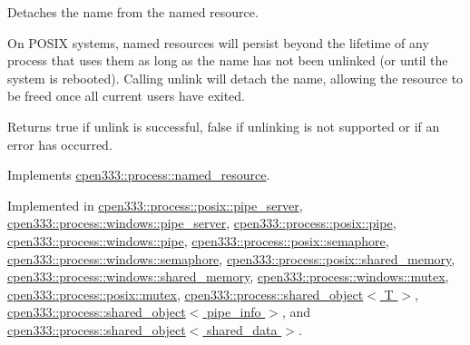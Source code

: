 Detaches the name from the named resource. 

On P\+O\+S\+IX systems, named resources will persist beyond the lifetime of any process that uses them as long as the name has not been unlinked (or until the system is rebooted). Calling {\ttfamily unlink} will detach the name, allowing the resource to be freed once all current users have exited.

\begin{DoxyReturn}{Returns}
{\ttfamily true} if unlink is successful, {\ttfamily false} if unlinking is not supported or if an error has occurred. 
\end{DoxyReturn}


Implements \hyperlink{classcpen333_1_1process_1_1named__resource_a5d33168fee48c9b0c58ab8fd96e230ce}{cpen333\+::process\+::named\+\_\+resource}.



Implemented in \hyperlink{classcpen333_1_1process_1_1posix_1_1pipe__server_a5c4da1864cb0db53e76d960230f3a83a}{cpen333\+::process\+::posix\+::pipe\+\_\+server}, \hyperlink{classcpen333_1_1process_1_1windows_1_1pipe__server_aa3f9fb4fd88042b09e130cd616815fe1}{cpen333\+::process\+::windows\+::pipe\+\_\+server}, \hyperlink{classcpen333_1_1process_1_1posix_1_1pipe_ac1dd8e1a7fd46480b709e96190afe697}{cpen333\+::process\+::posix\+::pipe}, \hyperlink{classcpen333_1_1process_1_1windows_1_1pipe_abe0bc707040aa7e82ed41c26cc4c93c1}{cpen333\+::process\+::windows\+::pipe}, \hyperlink{classcpen333_1_1process_1_1posix_1_1semaphore_aa6064e2c4b4b7282cc5e6eda877ee1bb}{cpen333\+::process\+::posix\+::semaphore}, \hyperlink{classcpen333_1_1process_1_1windows_1_1semaphore_abc5159f32e61024c6c6a978ac64fe39d}{cpen333\+::process\+::windows\+::semaphore}, \hyperlink{classcpen333_1_1process_1_1posix_1_1shared__memory_a3b6d67a41cfaca3712d87958682d8bbe}{cpen333\+::process\+::posix\+::shared\+\_\+memory}, \hyperlink{classcpen333_1_1process_1_1windows_1_1shared__memory_aa6efdc9a3e1310ea69ecc48aeb41286c}{cpen333\+::process\+::windows\+::shared\+\_\+memory}, \hyperlink{classcpen333_1_1process_1_1windows_1_1mutex_aa45381a0a226fbefc86eef8971a5431b}{cpen333\+::process\+::windows\+::mutex}, \hyperlink{classcpen333_1_1process_1_1posix_1_1mutex_ac1bcf9576d7470e5d64e17876c9cdb36}{cpen333\+::process\+::posix\+::mutex}, \hyperlink{classcpen333_1_1process_1_1shared__object_aa5b43829da5bd2376927e6285745211c}{cpen333\+::process\+::shared\+\_\+object$<$ T $>$}, \hyperlink{classcpen333_1_1process_1_1shared__object_aa5b43829da5bd2376927e6285745211c}{cpen333\+::process\+::shared\+\_\+object$<$ pipe\+\_\+info $>$}, and \hyperlink{classcpen333_1_1process_1_1shared__object_aa5b43829da5bd2376927e6285745211c}{cpen333\+::process\+::shared\+\_\+object$<$ shared\+\_\+data $>$}.

